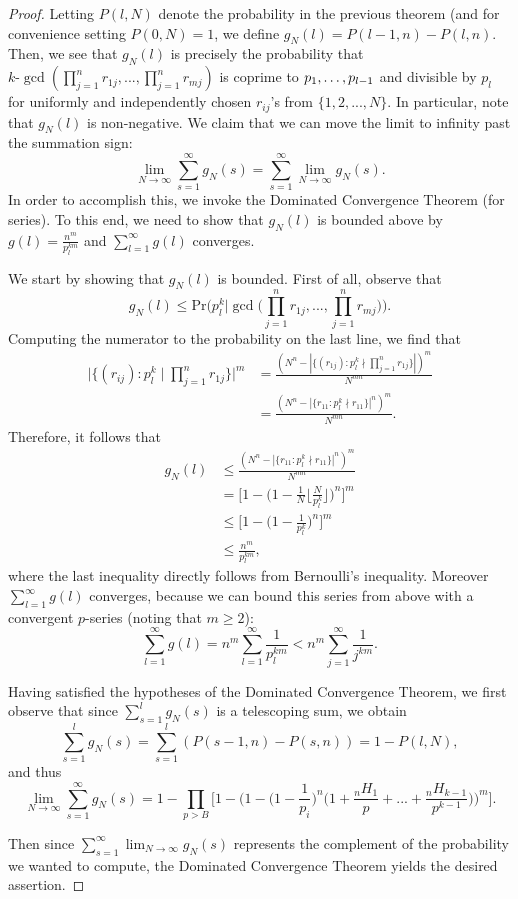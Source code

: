 \documentclass[12pt]{amsart}
\theoremstyle{definition}
\begin{document}
\begin{proof}
	Letting $P(l, N)$ denote the probability in the previous theorem (and for convenience setting $P(0, N) = 1$, we define $g_N(l) = P(l-1, n) - P(l, n)$. Then, we see that $g_N(l)$ is precisely the probability that $k\text{-}\gcd(\prod_{j=1}^n r_{1j}, ... , \prod_{j=1}^n r_{mj})$ is coprime to $p_1, \mathellipsis, p_{l-1}$ and divisible by $p_l$ for uniformly and independently chosen $r_{ij}$'s from $\{1, 2, ..., N\}$. In particular, note that $g_N(l)$ is non-negative. We claim that we can move the limit to infinity past the summation sign:
	$$\lim_{N \to \infty} \sum_{s=1}^{\infty} g_N(s) = \sum_{s=1}^{\infty} \lim_{N \to \infty} g_N(s).$$
	In order to accomplish this, we invoke the Dominated Convergence Theorem (for series). To this end, we need to show that $g_N(l)$ is bounded above by $g(l) = \frac{n^m}{p_{l}^{km}}$ and $\sum_{l=1}^{\infty} g(l)$ converges.
	
	We start by showing that $g_N(l)$ is bounded. First of all, observe that
	$$g_N(l) \leq \text{Pr}\Big(p_l^k \Big| \gcd\Big(\prod_{j=1}^n r_{1j}, ... , \prod_{j=1}^n r_{mj}\Big)\Big).$$
	Computing the numerator to the probability on the last line, we find that
	\begin{align*} 
		\Big|\{(r_{ij}) : p_l^k \mid \prod_{j=1}^n r_{1j}\}\Big|^m &= \frac{(N^n - |\{(r_{1j}) : p_l^k \nmid \prod_{j=1}^n r_{1j}\}|)^m}{N^{mn}}\\
		&= \frac{(N^n - |\{r_{11} : p_l^k \nmid r_{11}\}|^n)^m}{N^{mn}}. \end{align*}
	Therefore, it follows that
	\begin{align*} 
		g_N(l) &\leq \frac{(N^n - |\{r_{11} : p_l^k \nmid r_{11}\}|^n)^m}{N^{mn}}\\
		&= \Big[1 - \Big(1 - \frac{1}{N} \Big\lfloor \frac{N}{p_l^k}\Big\rfloor\Big)^n\Big]^m\\
		&\leq \Big[1 - \Big(1 - \frac{1}{p_l^k}\Big)^n\Big]^m\\
        &\leq \frac{n^m}{p_l^{km}},\end{align*}
	where the last inequality directly follows from Bernoulli's inequality. Moreover $\sum_{l=1}^{\infty} g(l)$ converges, because we can bound this series from above with a convergent $p$-series (noting that $m \geq 2$):
	$$\sum_{l=1}^{\infty} g(l) = n^m \sum_{l=1}^{\infty} \frac{1}{p_l^{km}} < n^m \sum_{j=1}^{\infty} \frac{1}{j^{km}}.$$
	
	Having satisfied the hypotheses of the Dominated Convergence Theorem, we first observe that since $\sum_{s=1}^l g_N(s)$ is a telescoping sum, we obtain
	$$\sum_{s=1}^l g_N(s) = \sum_{s=1}^l (P(s-1, n) - P(s, n)) = 1 - P(l, N),$$ 
	and thus
	$$\lim_{N \to \infty} \sum_{s=1}^{\infty} g_N(s) = 1 - \prod_{p > B} \Big[1 - \Big(1 - \Big(1-\frac{1}{p_i}\Big)^n \Big(1 + \frac{{}_nH_1}{p} + ... + \frac{{}_nH_{k-1}}{p^{k-1}}\Big)\Big)^m\Big].$$
	
	\noindent Then since $\displaystyle \sum_{s=1}^{\infty} \lim_{N \to \infty} g_N(s)$ represents the complement of the probability we wanted to compute, the Dominated Convergence Theorem yields the desired assertion.
\end{proof}
\end{document}
